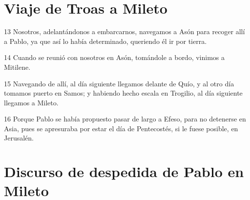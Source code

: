 \section*{Viaje de Troas a Mileto}

\par 13 Nosotros, adelantándonos a embarcarnos, navegamos a Asón para recoger allí a Pablo, ya que así lo había determinado, queriendo él ir por tierra.
\par 14 Cuando se reunió con nosotros en Asón, tomándole a bordo, vinimos a Mitilene.
\par 15 Navegando de allí, al día siguiente llegamos delante de Quío, y al otro día tomamos puerto en Samos; y habiendo hecho escala en Trogilio, al día siguiente llegamos a Mileto.
\par 16 Porque Pablo se había propuesto pasar de largo a Efeso, para no detenerse en Asia, pues se apresuraba por estar el día de Pentecostés, si le fuese posible, en Jerusalén.

\section*{Discurso de despedida de Pablo en Mileto}

